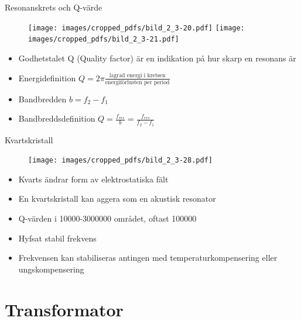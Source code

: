 \documentclass{beamer}
\begin{document}
\begin{frame}{Resonanskrets och Q-värde}

\begin{figure}[h]
\texttt{[image: images/cropped\_pdfs/bild\_2\_3-20.pdf]}
\texttt{[image: images/cropped\_pdfs/bild\_2\_3-21.pdf]}
\end{figure}

\begin{itemize}
  \item Godhetstalet Q (Quality factor) är en indikation på hur skarp en resonans är
  \item Energidefinition $Q = 2π\frac{\text{lagrad energi i kretsen}}{\text{energiförlusten per period}}$
    \item Bandbredden $b = f_2-f_1$
  \item Bandbreddsdefinition $Q = \frac{f_{res}}{b} = \frac{f_{res}}{f_2-f_1}$
  \end{itemize}
\end{frame}

\begin{frame}{Kvartskristall}

\begin{figure}[h]
\texttt{[image: images/cropped\_pdfs/bild\_2\_3-28.pdf]}
\end{figure}

\begin{itemize}
  \item Kvarts ändrar form av elektrostatiska fält
  \item En kvartskristall kan aggera som en akustisk resonator
  \item Q-värden i 10000-3000000 området, oftast 100000
  \item Hyfsat stabil frekvens
  \item Frekvensen kan stabiliseras antingen med temperaturkompensering eller ungskompensering
\end{itemize}
\end{frame}

\section{Transformator}
\end{document}
